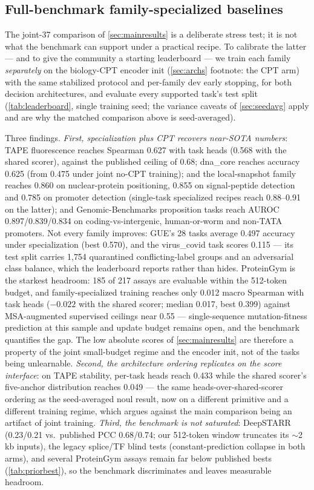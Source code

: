 \subsection{Full-benchmark family-specialized baselines}
\label{sec:leaderboard}

The joint-37 comparison of \cref{sec:mainresults} is a deliberate stress test; it is not
what the benchmark can support under a practical recipe. To calibrate the latter --- and to
give the community a starting leaderboard --- we train each family \emph{separately} on the
biology-CPT encoder init (\cref{sec:archs} footnote: the CPT arm) with the same stabilized
protocol and per-family dev early stopping, for both decision architectures, and evaluate
every supported task's test split (\cref{tab:leaderboard}, single training seed; the
variance caveats of \cref{sec:seedavg} apply and are why the matched comparison above is
seed-averaged).

Three findings. \emph{First, specialization plus CPT recovers near-SOTA numbers}:
TAPE fluorescence reaches Spearman 0.627 with task heads (0.568 with the shared scorer),
against the published ceiling of 0.68; dna\_core reaches accuracy 0.625 (from 0.475 under
joint no-CPT training); and the local-snapshot family reaches 0.860 on nuclear-protein
positioning, 0.855 on signal-peptide detection and 0.785 on promoter detection
(single-task specialized recipes reach 0.88--0.91 on the latter); and Genomic-Benchmarks
proposition tasks reach AUROC 0.897/0.839/0.834 on coding-vs-intergenic,
human-or-worm and non-TATA promoters. Not every family improves: GUE's 28 tasks
average 0.497 accuracy under specialization (best 0.570), and the virus\_covid task
scores 0.115 --- its test split carries 1{,}754 quarantined conflicting-label groups
and an adversarial class balance, which the leaderboard reports rather than hides.
ProteinGym is the starkest headroom: 185 of 217 assays are evaluable within the
512-token budget, and family-specialized training reaches only 0.012 macro Spearman with task
heads ($-0.022$ with the shared scorer; median 0.017, best 0.399) against
MSA-augmented supervised ceilings near 0.55 ---
single-sequence mutation-fitness prediction at this sample and update budget remains
open, and the benchmark quantifies the gap. The low absolute scores of \cref{sec:mainresults} are therefore a
property of the joint small-budget regime and the encoder init, not of the tasks being
unlearnable. \emph{Second, the architecture ordering replicates on the score interface}:
on TAPE stability, per-task heads reach 0.433 while the shared scorer's five-anchor
distribution reaches 0.049 --- the same heads-over-shared-scorer ordering as the seed-averaged
noul result, now on a different primitive and a different training regime, which argues
against the main comparison being an artifact of joint training. \emph{Third, the benchmark
is not saturated}: DeepSTARR (0.23/0.21 vs.\ published PCC 0.68/0.74; our 512-token window
truncates its ${\sim}$2\,kb inputs), the legacy splice/TF blind tests (constant-prediction
collapse in both arms), and several ProteinGym assays remain far below published bests
(\cref{tab:priorbest}), so the benchmark discriminates and leaves measurable headroom.

